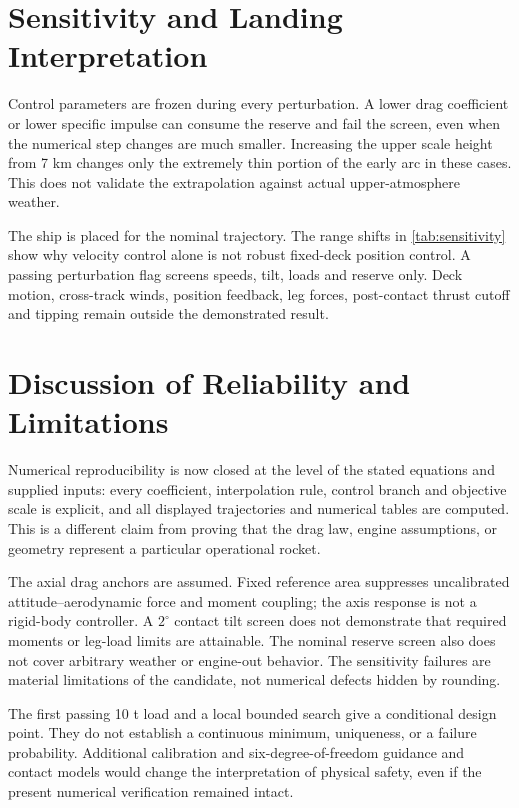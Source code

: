 \documentclass[11pt,a4paper]{article}
\begin{document}
\section{Sensitivity and Landing Interpretation}

Control parameters are frozen during every perturbation. A lower drag coefficient or lower specific impulse can consume the reserve and fail the screen, even when the numerical step changes are much smaller. Increasing the upper scale height from 7 km changes only the extremely thin portion of the early arc in these cases. This does not validate the extrapolation against actual upper-atmosphere weather.

The ship is placed for the nominal trajectory. The range shifts in \cref{tab:sensitivity} show why velocity control alone is not robust fixed-deck position control. A passing perturbation flag screens speeds, tilt, loads and reserve only. Deck motion, cross-track winds, position feedback, leg forces, post-contact thrust cutoff and tipping remain outside the demonstrated result.

\section{Discussion of Reliability and Limitations}
Numerical reproducibility is now closed at the level of the stated equations and supplied inputs: every coefficient, interpolation rule, control branch and objective scale is explicit, and all displayed trajectories and numerical tables are computed. This is a different claim from proving that the drag law, engine assumptions, or geometry represent a particular operational rocket.

The axial drag anchors are assumed. Fixed reference area suppresses uncalibrated attitude--aerodynamic force and moment coupling; the axis response is not a rigid-body controller. A $2^\circ$ contact tilt screen does not demonstrate that required moments or leg-load limits are attainable. The nominal reserve screen also does not cover arbitrary weather or engine-out behavior. The sensitivity failures are material limitations of the candidate, not numerical defects hidden by rounding.

The first passing 10 t load and a local bounded search give a conditional design point. They do not establish a continuous minimum, uniqueness, or a failure probability. Additional calibration and six-degree-of-freedom guidance and contact models would change the interpretation of physical safety, even if the present numerical verification remained intact.
\end{document}
